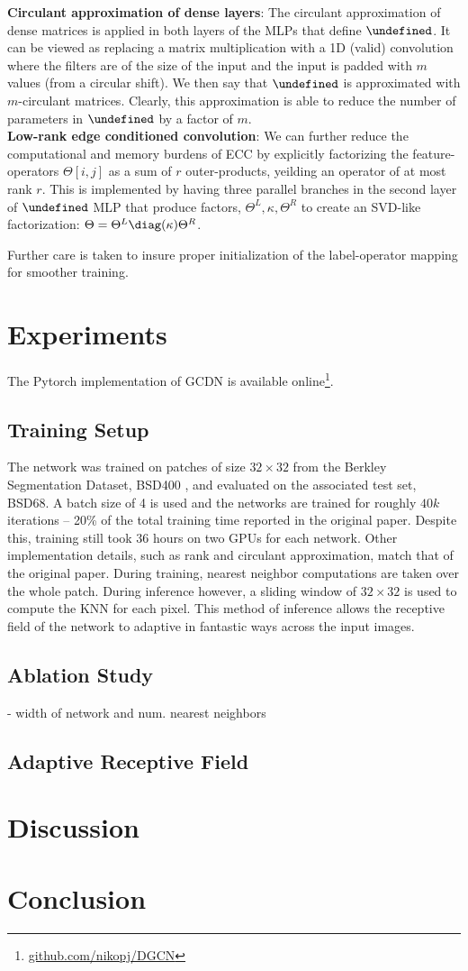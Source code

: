 \documentclass[12pt,a4paper,reqno]{amsart}
\let\F\undefined
\newcommand{\F}{\mathcal{F}}
\begin{document}
\textbf{Circulant approximation of dense layers}: The circulant approximation of
dense matrices is applied in both layers of the MLPs that define $\F$. It can be
viewed as replacing a matrix multiplication with a 1D (valid) convolution where
the filters are of the size of the input and the input is padded with $m$ values
(from a circular shift). We then say that $\F$ is approximated with
$m$-circulant matrices. Clearly, this approximation is able to reduce the number
of parameters in $\F$ by a factor of $m$.  \\

\textbf{Low-rank edge conditioned convolution}: We can further reduce the
computational and memory burdens of ECC by explicitly factorizing the
feature-operators $\Theta[i,j]$ as a sum of $r$ outer-products, yeilding an
operator of at most rank $r$. This is implemented by having three parallel
branches in the second layer of $\F$ MLP that produce factors, $\Theta^L,
\kappa, \Theta^R$ to create an SVD-like factorization: $\Theta = \Theta^L
\diag(\kappa) \Theta^R$.

Further care is taken to insure proper initialization of the label-operator
mapping for smoother training. 

\section{Experiments} \label{sec:experiments}
The Pytorch implementation of GCDN is available
online\footnote{\url{github.com/nikopj/DGCN}}.

\subsection{Training Setup}
The network was trained on patches of size $32\times 32$ from the Berkley
Segmentation Dataset, BSD400 \cite{bsd}, and evaluated on the associated test
set, BSD68. A batch size of 4 is used and the networks are trained for roughly
$40k$ iterations -- 20\% of the total training time reported in the original
paper. Despite this, training still took 36 hours on two GPUs for each network.
Other implementation details, such as rank and circulant approximation, match
that of the original paper. During training, nearest neighbor computations are
taken over the whole patch. During inference however, a sliding window of
$32\times 32$ is used to compute the KNN for each pixel. This method of
inference allows the receptive field of the network to adaptive in fantastic
ways across the input images. 

\subsection{Ablation Study}
- width of network and num. nearest neighbors
\subsection{Adaptive Receptive Field}

\section{Discussion}
\section{Conclusion}

\printbibliography
\end{document}
